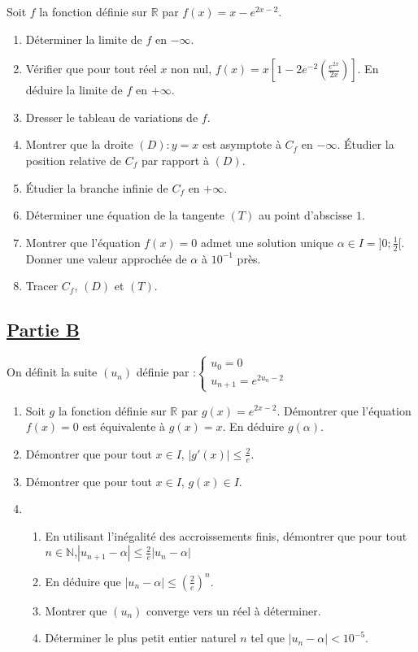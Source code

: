 \documentclass[12pt,a4paper]{article}
\begin{document}
Soit \( f \) la fonction définie sur \( \mathbb{R} \) par \( f(x) = x - e^{2x-2} \).

\begin{enumerate}
    \item Déterminer la limite de \( f \) en \( -\infty \).
    \item Vérifier que pour tout réel \( x \) non nul,  
    \(
    f(x) = x \left[ 1 - 2e^{-2} \left( \frac{e^{2x}}{2x} \right) \right].
    \)
    En déduire la limite de \( f \) en \( +\infty \).
    \item Dresser le tableau de variations de \( f \).
    \item Montrer que la droite \( (D) : y = x \) est asymptote à \( C_f \) en \( -\infty \).  
    Étudier la position relative de \( C_f \) par rapport à \( (D) \).
    \item Étudier la branche infinie de \( C_f \) en \( +\infty \).
    \item Déterminer une équation de la tangente \( (T) \) au point d’abscisse \( 1 \).
    \item Montrer que l’équation \( f(x) = 0 \) admet une solution unique \( \alpha \in I = ]0; \frac{1}{2}[ \).  
    Donner une valeur approchée de \( \alpha \) à \( 10^{-1} \) près.
    \item Tracer \( C_f \), \( (D) \) et \( (T) \).
\end{enumerate}

\subsection*{\underline{\textbf{Partie B}}}

On définit la suite \( (u_n) \) définie par :\(
\begin{cases}
u_0 = 0\\ 
u_{n+1} = e^{2u_n - 2}
\end{cases}
\)

\begin{enumerate}
    \item Soit \( g \) la fonction définie sur \( \mathbb{R} \) par \( g(x) = e^{2x-2} \).  
    Démontrer que l’équation \( f(x) = 0 \) est équivalente à \( g(x) = x \).  
    En déduire \( g(\alpha) \).
    \item Démontrer que pour tout \( x \in I \), \( |g'(x)| \leq \frac{2}{e} \).
    \item Démontrer que pour tout \( x \in I \), \( g(x) \in I \).
    \item 
    \begin{enumerate}
        \item En utilisant l’inégalité des accroissements finis, démontrer que pour tout \( n \in \mathbb{N} \),\( |u_{n+1} - \alpha| \leq \frac{2}{e} |u_n - \alpha| \)
        \item En déduire que 
\( |u_n - \alpha| \leq \left( \frac{2}{e} \right)^n. \)
        \item Montrer que \( (u_n) \) converge vers un réel à déterminer.
        \item Déterminer le plus petit entier naturel \( n \) tel que  
\( |u_n - \alpha| < 10^{-5}. \)
    \end{enumerate}
\end{enumerate}
\end{document}
